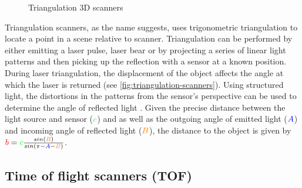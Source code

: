 \begin{figure}[H]
\begin{subfigure}[b]{.33\textwidth}
	\end{subfigure}
	\caption{Triangulation 3D scanners \cite{Form2014}}
	\label{fig:triangulation-scanners}
\end{figure}

Triangulation scanners, as the name suggests, uses trigonometric triangulation \cite{Frohlich2004} to locate a point in a scene relative to scanner. Triangulation can be performed by either emitting a laser pulse, laser bear or by projecting a series of linear light patterns and then picking up the reflection with a sensor at a known position. During laser triangulation, the displacement of the object affects the angle at which the laser is returned (see \autoref{fig:triangulation-scanners}). Using structured light, the distortions in the patterns from the sensor's perspective can be used to determine the angle of reflected light \cite{Brown2012}. Given the precise distance between the light source and sensor ($\begingroup\color{green}c\endgroup$) and as well as the outgoing angle of emitted light ($\begingroup\color{blue}A\endgroup$) and incoming angle of reflected light ($\begingroup\color{orange}B\endgroup$), the distance to the object is given by $\begingroup\color{red}b\endgroup = \begingroup\color{green}c\endgroup\frac{ sin(\begingroup\color{orange}B\endgroup)}{sin(\pi - \begingroup\color{blue}A\endgroup-\begingroup\color{orange}B\endgroup)}$.

\subsection{Time of flight scanners (TOF)}

